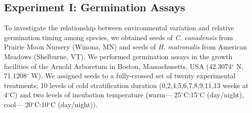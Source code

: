 \documentclass{article}[11pt]
\begin{document}


\subsection*{Experiment I: Germination Assays}
To investigate the relationship between environmental variation and relative germination timing among species, we obtained seeds of \textit{C. canadensis} from Prairie Moon Nursery (Winona, MN) and seeds of \textit{H. matronalis} from American Meadows (Shelburne, VT). %
We performed germination assays in the growth facilities of the Arnold Arboretum in Boston, Massachusetts, USA (42.3074$^{\circ}$ N, 71.1208$^{\circ}$ W). We assigned seeds to a fully-crossed set of twenty experimental treatments; 10 levels of cold stratification duration (0,2,4,5,6,7,8,9,11,13 weeks at 4$^{\circ}$C) and two levels of incubation temperature (warm--- 25$^{\circ}$C:15$^{\circ}$C (day/night), cool--- 20$^{\circ}$C:10$^{\circ}$C (day/night)).
\end{document}
